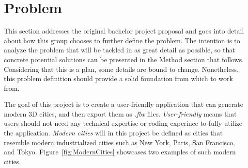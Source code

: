 \section{Problem}
\label{sec:problem}

This section addresses the original bachelor project proposal and goes into detail about how this group chooses to further define the problem.
The intention is to analyze the problem that will be tackled in as great detail as possible, so that concrete potential solutions can be presented in the Method section that follows.
Considering that this is a plan, some details are bound to change.
Nonetheless, this problem definition should provide a solid foundation from which to work from.

The goal of this project is to create a user-friendly application that can generate modern 3D cities, and then export them as \textit{.fbx} files.
\textit{User-friendly} means that users should not need any technical expertise or coding experince to fully utilize the application.
\textit{Modern cities} will in this project be defined as cities that resemble modern industrialized cities such as New York, Paris, San Francisco, and Tokyo.
Figure~\ref{fig:ModernCities} showcases two examples of such modern cities.

